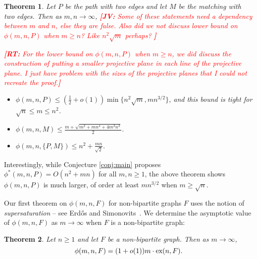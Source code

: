 \documentclass[12pt]{article}
\newcommand{\jv}[1]{\textcolor{red}{\textbf{[JV: } #1\textbf{]}}}
\newcommand{\rt}[1]{\textcolor{red}{\textbf{[RT: } #1\textbf{]}}}
\newtheorem{theorem}{Theorem}
\newcommand*{\ex}{\textnormal{ex}}
\begin{document}
\begin{theorem}\label{thm:pm}
Let $P$ be the path with two edges and let $M$ be the matching with two edges. Then as $m,n \rightarrow \infty$, \jv{Some of these statements need a dependency between $m$ and $n$, else they are false. Also did we not discuss lower bound on $\phi(m,n,P)$ when $m \geq n$? Like $n^2\sqrt{m}$ perhaps? }

\rt{For the lower bound on $\phi(m,n,P)$ when $m \geq n$, we did discuss the construction of putting a smaller projective plane in each line of the projective plane. I just have problem with the sizes of the projective planes that I could not recreate the proof.}


\begin{itemize}
    \item[{\rm 1.}] $\phi(m, n, P) \leq \left(\frac{1}{2} + o(1)\right)\min\{n^{2}\sqrt{m}, mn^{3/2}\}$, and this bound is tight for $\sqrt{n} \leq m \leq n^2$.
    \item[{\rm 3.}] $\phi(m, n, M) \leq \frac{m + \sqrt{m^2 + mn^4 + 4m^2n^3}}{2}$.
    \item[{\rm 4.}] $\phi(m, n, \{P, M\}) \leq n^2 + \frac{mn}{\sqrt{2}}$.
    \end{itemize}
 \end{theorem}

Interestingly, while Conjecture \ref{conj:main} 
proposes $\phi^*(m,n,P) = O(n^2 + mn)$ for all $m,n \geq 1$, the above theorem shows $\phi(m,n,P)$ is much larger, of order at least $mn^{3/2}$ when $m \geq \sqrt{n}$.  

 
 Our first theorem on $\phi(m,n,F)$ for non-bipartite graphs $F$ uses the notion of \textit{supersaturation} -- see Erd\H{o}s and Simonovits~\cite{ErdosSimonovits1983}. We determine the asymptotic value of $\phi(m,n,F)$ as $m \rightarrow \infty$ when $F$ is a non-bipartite graph:

\begin{theorem}\label{thm:asymp}
  Let $n \geq 1$ and let $F$ be a non-bipartite graph. Then as $m \rightarrow \infty$, 
  \[
    \phi(m, n, F) = (1 + o(1))m \cdot \ex(n, F).
  \]
\end{theorem}
\end{document}
